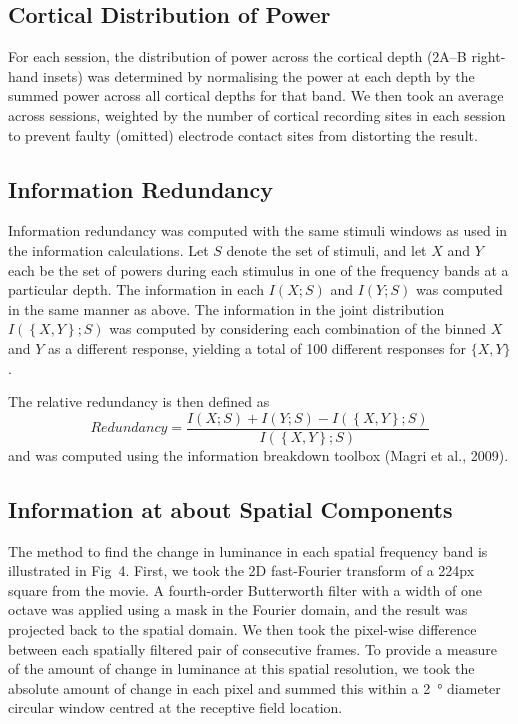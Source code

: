 \subsection{Cortical Distribution of Power}
For each session, the distribution of power across the cortical depth (2A--B right-hand insets) was determined by normalising the power at each depth by the summed power across all cortical depths for that band.
We then took an average across sessions, weighted by the number of cortical recording sites in each session to prevent faulty (omitted) electrode contact sites from distorting the result.

\subsection{Information Redundancy}
Information redundancy was computed with the same stimuli windows as used in the information calculations.
Let  $S$ denote the set of stimuli, and let  $X$ and  $Y$ each be the set of powers during each stimulus in one of the frequency bands at a particular depth.
The information in each  $I\left(X;S\right)$ and  $I(Y;S)$ was computed in the same manner as above.
The information in the joint distribution  $I(\left\{X,Y\right\};S)$ was computed by considering each combination of the binned  $X$ and  $Y$ as a different response, yielding a total of 100 different responses for  $\{X,Y\}$.

The relative redundancy is then defined as
\begin{equation*}
\mathit{Redundancy}=\frac{I\left(X;S\right)+I\left(Y;S\right)-I\left(\left\{X,Y\right\};S\right)}{I\left(\left\{X,Y\right\};S\right)}
\end{equation*}
and was computed using the information breakdown toolbox (Magri et al., 2009).


\subsection{Information at about Spatial Components}
The method to find the change in luminance in each spatial frequency band is illustrated in Fig~4.
First, we took the 2D fast-Fourier transform of a 224px square from the movie.
A fourth-order Butterworth filter with a width of one octave was applied using a mask in the Fourier domain, and the result was projected back to the spatial domain.
We then took the pixel-wise difference between each spatially filtered pair of consecutive frames.
To provide a measure of the amount of change in luminance at this spatial resolution, we took the absolute amount of change in each pixel and summed this within a \SI{2}{\degree} diameter circular window centred at the receptive field location.

